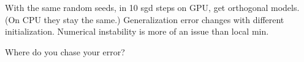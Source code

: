 





With the same random seeds, in 10 sgd steps on GPU, get orthogonal models. (On CPU they stay the same.)
Generalization error changes with different initialization. Numerical instability is more of an issue than local min.

Where do you chase your error?


